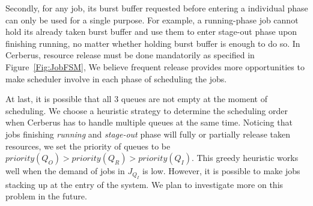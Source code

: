 Secondly, for any job,
its burst buffer requested before entering a individual phase can only be used for a single purpose.
For example, a running-phase job cannot hold its already taken burst buffer
and use them to enter stage-out phase upon finishing running,
no matter whether holding burst buffer is enough to do so.
In Cerberus, resource release must be done mandatorily as specified in Figure~\ref{Fig:JobFSM},
We believe frequent release provides more opportunities to make
scheduler involve in each phase of scheduling the jobs.

At last, it is possible that all 3 queues are not empty at the moment of scheduling.
We choose a heuristic strategy to determine the scheduling order when
Cerberus has to handle multiple queues at the same time.
Noticing that jobs finishing \textit{running} and \textit{stage-out} phase
will fully or partially release taken resources,
we set the priority of queues to be $priority(Q_O) > priority(Q_R) > priority(Q_I)$.
This greedy heuristic works well when the demand of jobs in $J_{Q_I}$ is low.
However, it is possible to make jobs stacking up at the entry of the system.
We plan to investigate more on this problem in the future.



